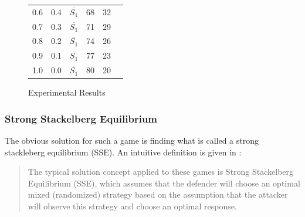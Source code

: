 \documentclass[a4paper,10pt]{article}
\begin{document}
\begin{figure}[H]
\begin{tabular}{llllll}
\multicolumn{1}{|l|}{0.6}             & \multicolumn{1}{l|}{0.4}              & \multicolumn{1}{l|}{$\overline{S_1}$}            & \multicolumn{1}{l|}{68}                         & \multicolumn{1}{l|}{32}                 &  \\ \cline{1-5}
\multicolumn{1}{|l|}{0.7}             & \multicolumn{1}{l|}{0.3}              & \multicolumn{1}{l|}{$\overline{S_1}$}            & \multicolumn{1}{l|}{71}                         & \multicolumn{1}{l|}{29}                 &  \\ \cline{1-5}
\multicolumn{1}{|l|}{0.8}             & \multicolumn{1}{l|}{0.2}              & \multicolumn{1}{l|}{$\overline{S_1}$}            & \multicolumn{1}{l|}{74}                         & \multicolumn{1}{l|}{26}                 &  \\ \cline{1-5}
\multicolumn{1}{|l|}{0.9}             & \multicolumn{1}{l|}{0.1}              & \multicolumn{1}{l|}{$\overline{S_1}$}            & \multicolumn{1}{l|}{77}                         & \multicolumn{1}{l|}{23}                 &  \\ \cline{1-5}
1.0                                   & 0.0                                   & $\overline{S_1}$                                 & 80                                              & 20                                      &  \\ \hline
\end{tabular}
\caption{Experimental Results}\label{tables: example result}
\end{figure}

\subsubsection{Strong Stackelberg Equilibrium}
The obvious solution for such a game is finding what is called a strong stackleberg equilibrium (SSE). An intuitive definition is given in \cite{korzhyk2011stackelberg}:
\begin{quote}
    The typical solution concept applied to these games is Strong  Stackelberg Equilibrium (SSE), which assumes that the defender will choose an optimal mixed (randomized) strategy based on the assumption that the attacker will observe this strategy and choose an optimal response.
\end{quote}
\end{document}
